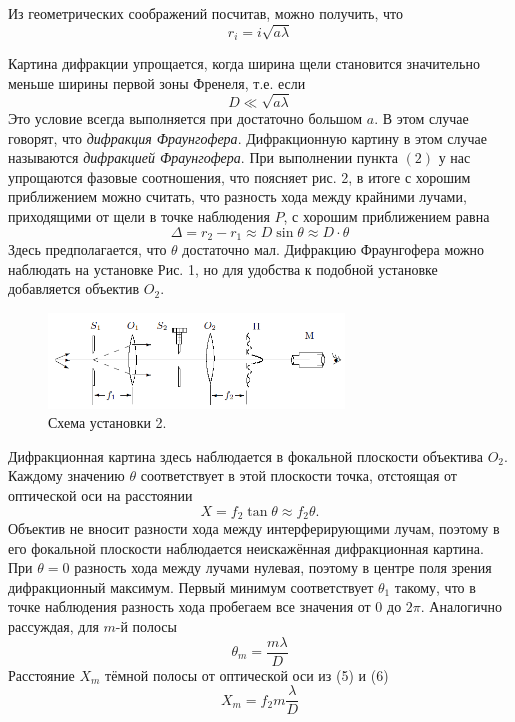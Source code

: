 Из геометрических соображений посчитав, можно получить, что 
\begin{equation}
r_i = i \sqrt{a \lambda}
\end{equation}

Картина дифракции упрощается, когда ширина щели становится значительно меньше ширины первой зоны Френеля, т.е. если 
\begin{equation}
D \ll\sqrt{a \lambda} 
\end{equation}	
Это условие всегда выполняется при достаточно большом $a$. В этом случае говорят, что \textit{дифракция Фраунгофера}. Дифракционную картину в этом случае называются \textit{дифракцией Фраунгофера}. При выполнении пункта $(2)$ у нас упрощаются фазовые соотношения, что поясняет рис. 2, в итоге с хорошим приближением можно считать, что разность хода между крайними лучами, приходящими от щели в точке наблюдения $P$, с хорошим приближением равна 
\begin{equation}
\Delta = r_2 - r_1 \approx D \sin \theta \approx D \cdot \theta
\end{equation}
Здесь предполагается, что $\theta$ достаточно мал.
Дифракцию Фраунгофера можно наблюдать на установке Рис. 1, но для удобства к подобной установке добавляется объектив $O_2$.

\begin{figure}[h]
\includegraphics[width = 0.7\textwidth]{3.png}
\centering
\caption{Схема установки 2.}
\end{figure}
Дифракционная картина здесь наблюдается в фокальной плоскости объектива $O_2$. Каждому значению $\theta$ соответствует в этой плоскости точка, отстоящая от оптической оси на расстоянии 
\begin{equation}
X = f_2 \tan \theta \approx f_2 \theta.
\end{equation}
Объектив не вносит разности хода между интерферирующими лучам, поэтому в его фокальной плоскости наблюдается неискажённая дифракционная картина. При $\theta = 0$ разность хода между лучами нулевая, поэтому в центре поля зрения дифракционный максимум. Первый минимум соответствует $\theta_1$ такому, что в точке наблюдения разность хода пробегаем все значения от 0 до $2\pi$. Аналогично рассуждая, для $m$-й полосы
\begin{equation}
\theta_m = \frac{m \lambda}{D}
\end{equation}
Расстояние $X_m$ тёмной полосы от оптической оси из (5) и (6)
\begin{equation}
X_m = f_2m\frac{\lambda}{D}
\end{equation}

